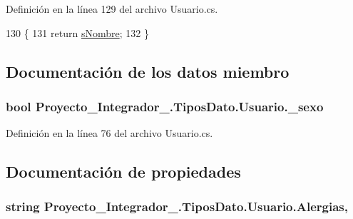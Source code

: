 Definición en la línea 129 del archivo Usuario.\-cs.


\begin{DoxyCode}
130         \{
131             \textcolor{keywordflow}{return} \hyperlink{class_proyecto___integrador__3_1_1_tipos_dato_1_1_usuario_a22974b12ffb877b220ac230d9ce48615}{sNombre};
132         \}
\end{DoxyCode}


\subsection{Documentación de los datos miembro}
\hypertarget{class_proyecto___integrador__3_1_1_tipos_dato_1_1_usuario_a1a0f91fb9a1e9b12a534a31295531498}{
\subsubsection[{\-\_\-sexo}]{\setlength{\rightskip}{0pt plus 5cm}bool Proyecto\-\_\-\-Integrador\-\_.\-Tipos\-Dato.\-Usuario.\-\_\-sexo}}\label{class_proyecto___integrador__3_1_1_tipos_dato_1_1_usuario_a1a0f91fb9a1e9b12a534a31295531498}


Definición en la línea 76 del archivo Usuario.\-cs.



\subsection{Documentación de propiedades}
\hypertarget{class_proyecto___integrador__3_1_1_tipos_dato_1_1_usuario_ab943506068326001f8581e7df6df6c14}{
\subsubsection[{Alergias}]{\setlength{\rightskip}{0pt plus 5cm}string Proyecto\-\_\-\-Integrador\-\_.\-Tipos\-Dato.\-Usuario.\-Alergias\hspace{0.3cm}{\ttfamily [get]}, {\ttfamily [set]}}}\label{class_proyecto___integrador__3_1_1_tipos_dato_1_1_usuario_ab943506068326001f8581e7df6df6c14}


